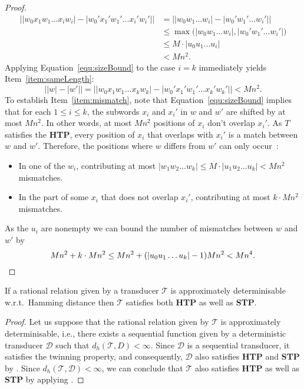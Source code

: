 \documentclass[a4paper,UKenglish,cleveref, autoref, thm-restate,authorcolumns, colorlinks]{lipics-v2021}
\newcommand\calD{\mathcal{D}}
\newcommand\calT{\mathcal{T}}
\newcommand{\STP}[0]{\textbf{STP}}
\newcommand{\HTP}[0]{\textbf{HTP}}
\newcommand{\dHam}[2]{d_{h}(#1,#2)}
\begin{document}
{\begin{proof}
    \begin{equation} \label{equ:sizeBound}
        \begin{aligned}
            \big| |w_0 x_1 w_1 \dots x_{i} w_{i}| - |w_0' x_1' w_1' \dots x_{i}' w_{i}'| \big|
            &= \big| |w_0 w_1 \dots w_{i}| - |w_0' w_1' \dots w_{i}'| \big| \\
            &\leq \max \big( |w_0 w_1 \dots w_{i}|, |w_0' w_1' \dots w_{i}'| \big) \\
            &\leq M \cdot |u_0 u_1 \dots u_{i}| \\
            &< Mn^2.
        \end{aligned}
    \end{equation}
    Applying Equation~\eqref{equ:sizeBound} to the case $i = k$ immediately yields Item~\ref{item:sameLength}:
    \[
        \big| |w| - |w'| \big| = \big| |w_0 x_1 w_1 \dots x_{k} w_{k}| - |w_0' x_1' w_1' \dots x_{k}' w_{k}'| \big| < Mn^2.
    \]
    To establish Item~\ref{item:mismatch},
    note that Equation~\eqref{equ:sizeBound} implies that for each $1 \leq i \leq k$,
    the subwords $x_i$ and $x_i'$ in $w$ and $w'$ are shifted by at most $Mn^2$.
    In other words, at most $Mn^2$ positions of $x_i$ don't overlap $x_i'$.
    As $T$ satisfies the \HTP{}, every position of $x_i$ that overlaps with $x_i'$
    is a match between $w$ and $w'$.
    Therefore, the positions where $w$ differs from $w'$ can only occur~:
    \begin{itemize}
        \item In one of the $w_i$,
        contributing at most $|w_1 w_2 \dots w_k| \leq M \cdot |u_1 u_2 \dots u_k| < Mn^2$ mismatches.
        \item In the part of some $x_i$ that does not overlap $x_i'$, contributing at most $k \cdot Mn^2$ mismatches.
    \end{itemize}
    As the $u_i$ are nonempty we can bound the number of mismatches between $w$ and $w'$ by
    \[
        Mn^2 + k \cdot Mn^2 \leq Mn^2 + (|u_0u_1 \ldots u_k|-1) Mn^2 < Mn^4.\qedhere
    \]
\end{proof}


\begin{proposition}\label{proposition:approxtoHTPSTP}
   If a rational relation given by a transducer $\calT$
   is approximately determinisable w.r.t.~Hamming distance
   then $\calT$ satisfies both \HTP{} as well as \STP{}.
\end{proposition}
\begin{proof}
    Let us suppose that the rational relation given by $\calT$
    is approximately determinisable, i.e.,
    there exists a sequential function given by a deterministic transducer $\calD$ such that $\dHam{\calT}{D} < \infty$.
    Since $\calD$ is a sequential transducer, it satisfies the twinning property, and consequently,
    $\calD$ also satisfies \HTP{} and \STP{} by .
    Since $\dHam{\calT}{\calD} <\infty$, we can conclude that $\calT$ also satisfies \HTP{} as well as \STP{}
    by applying .
\end{proof}


}
\end{document}
